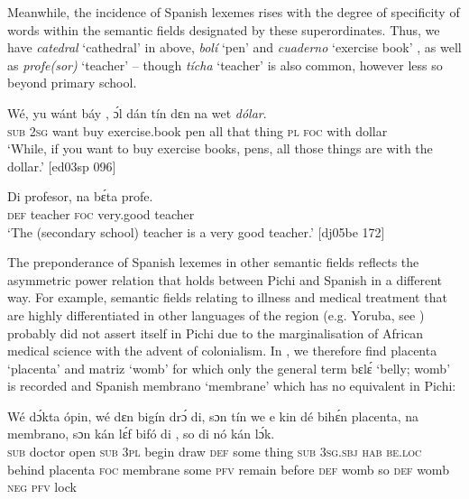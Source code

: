 Meanwhile, the incidence of Spanish lexemes rises with the degree of specificity of words within the semantic fields designated by these superordinates. Thus, we have \textit{catedral} ‘cathedral’ in  above, \textit{bolí} ‘pen’ and \textit{cuaderno} ‘exercise book’ , as well as \textit{profe(sor)} ‘teacher’ – though \textit{tícha} ‘teacher’ is also common, however less so beyond primary school. 


\ea%
    \label{ex:key:1759}
    \gll Wé,  yu  wánt  báy  ,      ɔ́l  dán  tín    dɛn
na  wet    \textit{dólar}.\\
\textsc{sub}  \textsc{2sg}  want  buy  exercise.book    pen  all  that  thing  \textsc{pl}  
\textsc{foc}  with    dollar\\

\glt ‘While, if you want to buy exercise books, pens, all those things are
with the dollar.’ [ed03sp 096]
\z


\ea%
    \label{ex:key:1760}
    \gll Di  profesor,    na  bɛ́ta      profe.\\
\textsc{def}  teacher    \textsc{foc}  very.good  teacher\\

\glt ‘The (secondary school) teacher is a very good teacher.’ [dj05be 172]
\z

The preponderance of Spanish lexemes in other semantic fields reflects the asymmetric power relation that holds between Pichi and Spanish in a different way. For example, semantic fields relating to illness and medical treatment that are highly differentiated in other languages of the region (e.g. Yoruba, see \citet{Adegbite1993}) probably did not assert itself in Pichi due to the marginalisation of African medical science with the advent of colonialism. In , we therefore find placenta ‘placenta’ and matriz ‘womb’ for which only the general term bɛlɛ́ ‘belly; womb’ is recorded and Spanish membrano ‘membrane’ which has no equivalent in Pichi: 


\ea%
    \label{ex:key:1761}
    \gll Wé  dɔ́kta  ópin,  wé  dɛn  bigín  drɔ́    di,  sɔn    tín    we
e    kin  dé    bihɛ́n  placenta,    na  membrano,  sɔn    kán  lɛ́f
bifó    di  ,  so  di    nó  kán  lɔ́k.\\
\textsc{sub}  doctor  open  \textsc{sub}  \textsc{3pl}  begin  draw  \textsc{def}  some  thing  \textsc{sub}
\textsc{3sg.sbj}  \textsc{hab}  \textsc{be.loc}  behind  placenta    \textsc{foc}  membrane  some  \textsc{pfv}  remain
before  \textsc{def}  womb  so  \textsc{def}  womb  \textsc{neg}  \textsc{pfv}  lock\\

